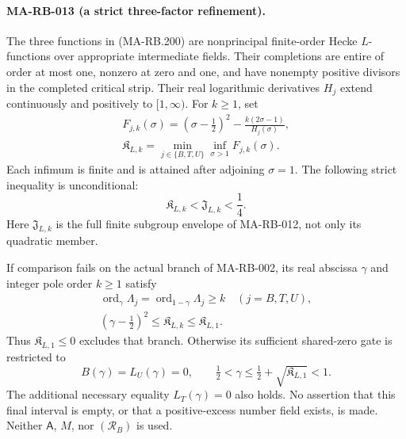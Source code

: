 \paragraph{MA-RB-013 (a strict three-factor refinement).}
The three functions in (MA-RB.200) are nonprincipal finite-order
Hecke \(L\)-functions over appropriate intermediate fields.
Their completions are entire of order at most one, nonzero at
zero and one, and have nonempty positive divisors in the
completed critical strip. Their real logarithmic derivatives
\(H_j\) extend continuously and positively to \([1,\infty)\).
For \(k\ge1\), set
\[
 \begin{gathered}
 F_{j,k}(\sigma)=(\sigma-\tfrac12)^2
                  -\frac{k(2\sigma-1)}{H_j(\sigma)},\\
 \mathfrak K_{L,k}=\min_{j\in\{B,T,U\}}
                            \inf_{\sigma>1}F_{j,k}(\sigma).
 \end{gathered}
 \tag{MA-RB.202}
\]
Each infimum is finite and is attained after adjoining
\(\sigma=1\). The following strict inequality is unconditional:
\[
             \mathfrak K_{L,k}<\mathfrak J_{L,k}<\frac14.
 \tag{MA-RB.203}
\]
Here \(\mathfrak J_{L,k}\) is the full finite subgroup envelope
of MA-RB-012, not only its quadratic member.

If comparison fails on the actual branch of MA-RB-002, its
real abscissa \(\gamma\) and integer pole order \(k\ge1\)
satisfy
\[
 \begin{gathered}
 \operatorname{ord}_{\gamma}\Lambda_j
    =\operatorname{ord}_{1-\gamma}\Lambda_j\ge k
                                  \quad(j=B,T,U),\\
 (\gamma-\tfrac12)^2\le\mathfrak K_{L,k}
                                     \le\mathfrak K_{L,1}.
 \end{gathered}
 \tag{MA-RB.204}
\]
Thus \(\mathfrak K_{L,1}\le0\) excludes that branch.
Otherwise its sufficient shared-zero gate is restricted to
\[
 B(\gamma)=L_U(\gamma)=0,\qquad
 \tfrac12<\gamma\le\tfrac12+\sqrt{\mathfrak K_{L,1}}<1.
 \tag{MA-RB.205}
\]
The additional necessary equality \(L_T(\gamma)=0\) also
holds. No assertion that this final interval is empty, or that
a positive-excess number field exists, is made. Neither
\(\mathsf A\), \(M\), nor \((\mathcal R_B)\) is used.

